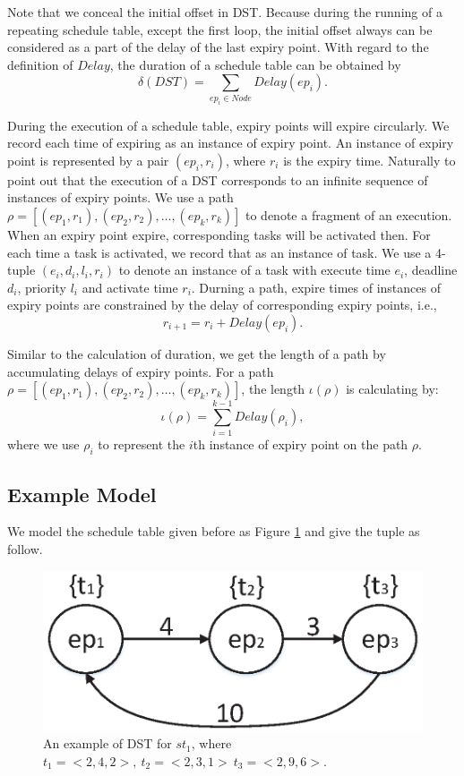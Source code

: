 \documentclass[sigconf]{acmart}
\begin{document}
Note that we conceal the initial offset in DST. Because during the running of a repeating schedule table, except the first loop, the initial offset always can be considered as a part of the delay of the last expiry point. With regard to the definition of $Delay$, the duration of a schedule table can be obtained by 
\[\delta(DST)=\sum\limits_{ep_i\in Node}Delay(ep_i).\]

During the execution of a schedule table, expiry points will expire circularly. We record each time of expiring as an instance of expiry point. An instance of expiry point is represented by a pair $(ep_i,r_i)$, where $r_i$ is the expiry time. 
Naturally to point out that the execution of a DST corresponds to an infinite sequence of instances of expiry points. 
We use a path $\rho=[(ep_1,r_1),(ep_2,r_2),\dots,(ep_k,r_k)]$ to denote a fragment of an execution. When an expiry point expire, corresponding tasks will be activated then. For each time a task is activated, we record that as an instance of task. We use a 4-tuple $(e_i,d_i,l_i,r_i)$ to denote an instance of a task with execute time $e_i$, deadline $d_i$, priority $l_i$ and activate time $r_i$. Durning a path, expire times of instances of expiry points are constrained by the delay of corresponding expiry points, i.e., 
\[r_{i+1}=r_i+Delay(ep_i).\]

Similar to the calculation of duration, we get the length of a path by accumulating delays of expiry points. For a path $\rho=[(ep_1,r_1),(ep_2,r_2),\dots,(ep_k,r_k)]$, the length $\iota(\rho)$ is calculating by: 
\[\iota(\rho)=\sum_{i=1}^{k-1} Delay(\rho_i),\]
where we use $\rho_i$ to represent the $i$th instance of expiry point on the path $\rho$. %


\subsection{Example Model}\label{section_dst_1}
We model the schedule table given before as Figure \ref{figure_dst1} and give the tuple as follow.
\begin{figure}
  \centering
  \includegraphics[scale=.4]{graphics/figure_dst1.eps}
  \caption{An example of DST for $st_1$, where $t_1=<2,4,2>,\ t_2=<2,3,1>\ t_3=<2,9,6>$.}
  \label{figure_dst1}
\end{figure}
\end{document}
